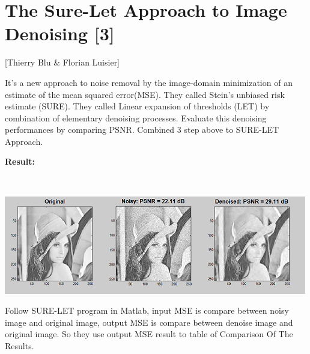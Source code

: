\section{The Sure-Let Approach to Image Denoising [3]}

 [Thierry Blu \& Florian Luisier]
\vspace{0.5cm}

It’s a new approach to noise removal by the image-domain minimization of an estimate of the mean squared error(MSE). They called  Stein’s unbiased risk estimate (SURE).  They called  Linear expansion of thresholds  (LET) by combination of elementary denoising processes.  Evaluate this denoising performances by comparing PSNR. Combined 3 step above to  SURE-LET Approach.
\vspace{1cm}




	


\textbf{Result:}

\

\includegraphics{surelet1.png}

\vspace{1cm}


Follow SURE-LET program in Matlab, input MSE is compare between noisy image and original image, output MSE is compare between denoise image and original image. So they use output MSE result to table of Comparison Of The Results.
\vspace{1.5cm}

